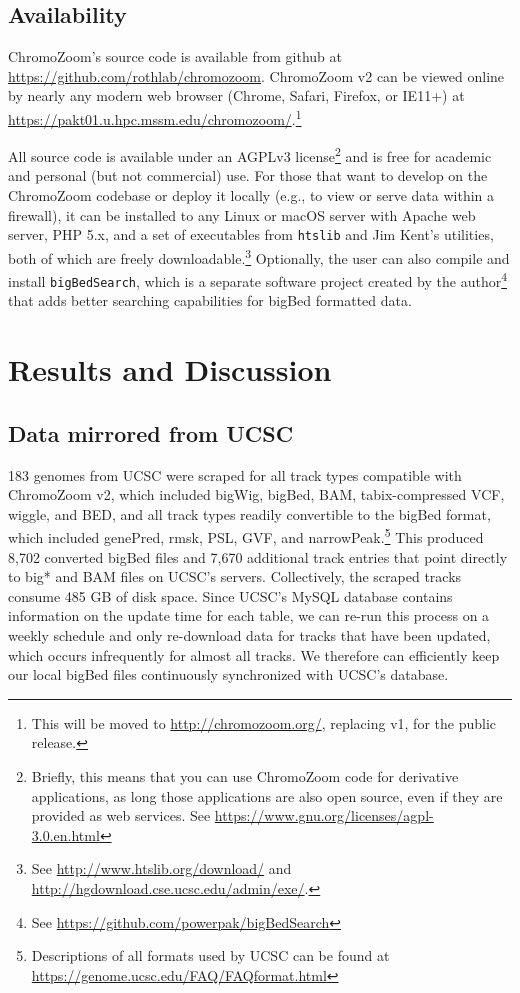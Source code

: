 \subsection{Availability}

ChromoZoom's source code is available from github at \url{https://github.com/rothlab/chromozoom}. ChromoZoom v2 can be viewed online by nearly any modern web browser (Chrome, Safari, Firefox, or IE11+) at \url{https://pakt01.u.hpc.mssm.edu/chromozoom/}.\footnote{This will be moved to \url{http://chromozoom.org/}, replacing v1, for the public release.}

All source code is available under an AGPLv3 license\footnote{Briefly, this means that you can use ChromoZoom code for derivative applications, as long those applications are also open source, even if they are provided as web services. See \url{https://www.gnu.org/licenses/agpl-3.0.en.html}} and is free for academic and personal (but not commercial) use. For those that want to develop on the ChromoZoom codebase or deploy it locally (e.g., to view or serve data within a firewall), it can be installed to any Linux or macOS server with Apache web server, PHP 5.x, and a set of executables from \texttt{htslib} and Jim Kent's utilities, both of which are freely downloadable.\footnote{See \url{http://www.htslib.org/download/} and \url{http://hgdownload.cse.ucsc.edu/admin/exe/}.} Optionally, the user can also compile and install \texttt{bigBedSearch}, which is a separate software project created by the author\footnote{See \url{https://github.com/powerpak/bigBedSearch}} that adds better searching capabilities for bigBed formatted data.

\section{Results and Discussion}

\subsection{Data mirrored from UCSC}

183 genomes from UCSC were scraped for all track types compatible with ChromoZoom v2, which included bigWig, bigBed, BAM,\autocite{Li2009b} tabix-compressed VCF,\autocite{Danecek2011,Li2011} wiggle, and BED, and all track types readily convertible to the bigBed format, which included genePred, rmsk, PSL, GVF, and narrowPeak.\footnote{Descriptions of all formats used by UCSC can be found at \url{https://genome.ucsc.edu/FAQ/FAQformat.html}} This produced 8,702 converted bigBed files and 7,670 additional track entries that point directly to big* and BAM files on UCSC's servers. Collectively, the scraped tracks consume 485 GB of disk space. Since UCSC's MySQL database contains information on the update time for each table, we can re-run this process on a weekly schedule and only re-download data for tracks that have been updated, which occurs infrequently for almost all tracks. We therefore can efficiently keep our local bigBed files continuously synchronized with UCSC's database.

